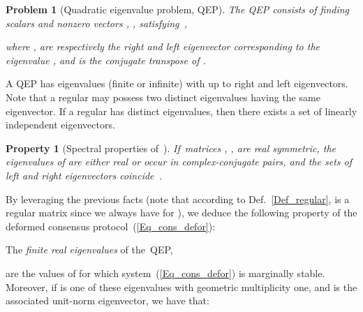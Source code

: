 \documentclass[letterpaper,9pt,twocolumn]{autart}
\newtheorem{problem}{\textbf{Problem}}
\newtheorem{property}{\textbf{Property}}
\begin{document}
\begin{problem}[Quadratic eigenvalue problem, QEP]
The QEP consists of finding scalars  and nonzero vectors , ,
satisfying~\cite{TisseurMe_SIAM01},

where ,  are respectively the right and left eigenvector corresponding
to the eigenvalue , and  is the conjugate transpose of .~\hfill
\end{problem}

A QEP has  eigenvalues (finite or infinite) with up to  right and  left eigenvectors.
Note that a regular  may possess two distinct eigenvalues having the same eigenvector.
If a regular  has  distinct eigenvalues, then there exists a set
of  linearly independent eigenvectors.


\begin{property}[Spectral properties of\, ]\label{Prop_Q_lambda}
If~matrices , ,  are \emph{real symmetric}, the eigenvalues of 
are either real or occur in complex-conjugate pairs, and the sets of
left and right eigenvectors coincide~\cite{TisseurMe_SIAM01}.~\hfill
\end{property}

By leveraging the previous facts (note that according to Def.~\ref{Def_regular}, 
 is a regular matrix since we always
have  for ),
we deduce the following property of
the deformed consensus protocol~(\ref{Eq_cons_defor}):

\begin{proposition}\label{Prop_Main}
The \emph{finite real eigenvalues}  of the~QEP,

are the values of  for which system~(\ref{Eq_cons_defor}) is marginally stable. Moreover, if
 is one of these eigenvalues with geometric
multiplicity one, and  is the associated
unit-norm eigenvector, we have that:

\end{proposition}
\end{document}
